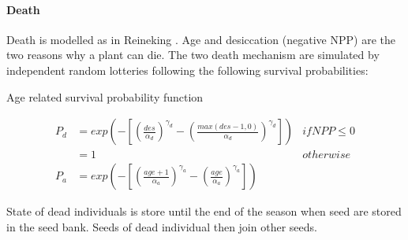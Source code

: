 \paragraph{Death} Death is modelled as in Reineking \cite{reineking_environmental_2006}. Age and desiccation (negative NPP) are the two reasons why a plant can die. The two death mechanism are simulated by independent random lotteries following the following survival probabilities:

\begin{marginfigure}[-10pt]
\label{fig:derivaives}
\caption{Age related survival probability function}
\end{marginfigure}

\begin{align}
P_{d} &=  exp \left( - \left[\left(\frac{des}{\alpha_{d}}\right)^{\gamma_{d}} - \left(\frac{max(des - 1, 0)}{\alpha_{d}}\right)^{\gamma_{d}}\right]\right) & if NPP \le 0\\
&= 1 & otherwise\\
P_{a} &= exp \left( - \left[\left(\frac{age + 1}{\alpha_{a}}\right)^{\gamma_{a}} - \left(\frac{age}{\alpha_{a}}\right)^{\gamma_{a}}\right]\right)
\end{align}

State of dead individuals is store until the end of the season when seed are stored in the seed bank. Seeds of dead individual then join other seeds.

